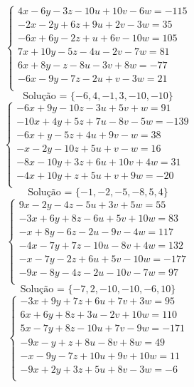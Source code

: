 \documentclass[12pt,oneside,a4paper]{article}
\begin{document}
\vspace{\baselineskip}
\begin{equation*}
\begin{cases}
4x-6y-3z-10u+10v-6w=-115 \\
-2x-2y+6z+9u+2v-3w=35 \\
-6x+6y-2z+u+6v-10w=105 \\
7x+10y-5z-4u-2v-7w=81 \\
6x+8y-z-8u-3v+8w=-77 \\
-6x-9y-7z-2u+v-3w=21 \\
\end{cases}
\end{equation*}
\begin{equation*}
\text{Solução = }\{-6,4,-1,3,-10,-10\}
\end{equation*}
\vspace{\baselineskip}
\begin{equation*}
\begin{cases}
-6x+9y-10z-3u+5v+w=91 \\
-10x+4y+5z+7u-8v-5w=-139 \\
-6x+y-5z+4u+9v-w=38 \\
-x-2y-10z+5u+v-w=16 \\
-8x-10y+3z+6u+10v+4w=31 \\
-4x+10y+z+5u+v+9w=-20 \\
\end{cases}
\end{equation*}
\begin{equation*}
\text{Solução = }\{-1,-2,-5,-8,5,4\}
\end{equation*}
\vspace{\baselineskip}
\begin{equation*}
\begin{cases}
9x-2y-4z-5u+3v+5w=55 \\
-3x+6y+8z-6u+5v+10w=83 \\
-x+8y-6z-2u-9v-4w=117 \\
-4x-7y+7z-10u-8v+4w=132 \\
-x-7y-2z+6u+5v-10w=-177 \\
-9x-8y-4z-2u-10v-7w=97 \\
\end{cases}
\end{equation*}
\begin{equation*}
\text{Solução = }\{-7,2,-10,-10,-6,10\}
\end{equation*}
\vspace{\baselineskip}
\begin{equation*}
\begin{cases}
-3x+9y+7z+6u+7v+3w=95 \\
6x+6y+8z+3u-2v+10w=110 \\
5x-7y+8z-10u+7v-9w=-171 \\
-9x-y+z+8u-8v+8w=49 \\
-x-9y-7z+10u+9v+10w=11 \\
-9x+2y+3z+5u+8v-3w=-6 \\
\end{cases}
\end{equation*}
\end{document}
